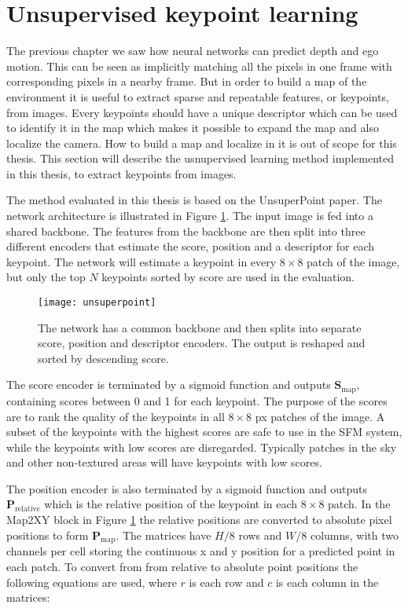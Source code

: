 \section{Unsupervised keypoint learning}

The previous chapter we saw how neural networks can predict depth and ego motion. This can be seen as implicitly matching all the pixels in one frame with corresponding pixels in a nearby frame. But in order to build a map of the environment it is useful to extract sparse and repeatable features, or keypoints, from images. Every keypoints should have a unique descriptor which can be used to identify it in the map which makes it possible to expand the map and also localize the camera. How to build a map and localize in it is out of scope for this thesis. This section will describe the usnupervised learning method implemented in this thesis, to extract keypoints from images.

The method evaluated in this thesis is based on the UnsuperPoint paper\cite{unsuperpoint}. The network architecture is illustrated in Figure \ref{fig:unsuperpoint}. The input image is fed into a shared backbone. The features from the backbone are then split into three different encoders that estimate the score, position and a descriptor for each keypoint. The network will estimate a keypoint in every $8\times 8$ patch of the image, but only the top $N$ keypoints sorted by score are used in the evaluation.

\begin{figure}[H]
	\centering
	\texttt{[image: unsuperpoint]}
	\caption{The network has a common backbone and then splits into separate score, position and descriptor encoders. The output is reshaped and sorted by descending score.}
	\label{fig:unsuperpoint}
\end{figure}

The score encoder is terminated by a sigmoid function and outputs $\textbf{S}_{\mathrm{map}}$, containing scores between 0 and 1 for each keypoint. The purpose of the scores are to rank the quality of the keypoints in all $8\times 8$ px patches of the image. A subset of the keypoints with the highest scores are safe to use in the SFM system, while the keypoints with low scores are disregarded. Typically patches in the sky and other non-textured areas will have keypoints with low scores.

The position encoder is also terminated by a sigmoid function and outputs $\textbf{P}_{\textrm{relative}}$ which is the relative position of the keypoint in each $8 \times 8$ patch. In the Map2XY block in Figure \ref{fig:unsuperpoint} the relative positions are converted to absolute pixel positions to form $\textbf{P}_{\textrm{map}}$. The matrices have $H/8$ rows and $W/8$ columns, with two channels per cell storing the continuous x and y position for a predicted point in each patch. To convert from from relative to absolute point positions the following equations are used, where $r$ is each row and $c$ is each column in the matrices:

